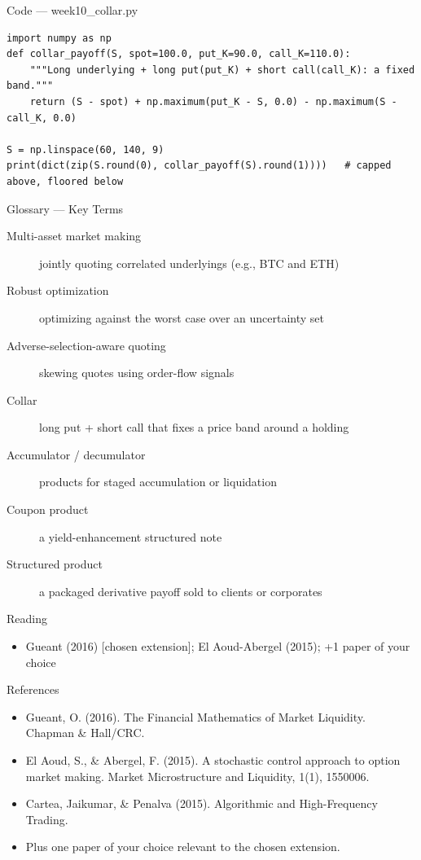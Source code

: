 \documentclass[aspectratio=169,10pt]{beamer}
\begin{document}
\begin{frame}[fragile]{Code --- week10\_collar.py}
\begin{lstlisting}
import numpy as np
def collar_payoff(S, spot=100.0, put_K=90.0, call_K=110.0):
    """Long underlying + long put(put_K) + short call(call_K): a fixed band."""
    return (S - spot) + np.maximum(put_K - S, 0.0) - np.maximum(S - call_K, 0.0)

S = np.linspace(60, 140, 9)
print(dict(zip(S.round(0), collar_payoff(S).round(1))))   # capped above, floored below
\end{lstlisting}
\end{frame}
\begin{frame}{Glossary --- Key Terms}
\footnotesize\begin{description}
\item[\color{ncsured}Multi-asset market making] jointly quoting correlated underlyings (e.g., BTC and ETH)
\item[\color{ncsured}Robust optimization] optimizing against the worst case over an uncertainty set
\item[\color{ncsured}Adverse-selection-aware quoting] skewing quotes using order-flow signals
\item[\color{ncsured}Collar] long put + short call that fixes a price band around a holding
\item[\color{ncsured}Accumulator / decumulator] products for staged accumulation or liquidation
\item[\color{ncsured}Coupon product] a yield-enhancement structured note
\item[\color{ncsured}Structured product] a packaged derivative payoff sold to clients or corporates
\end{description}
\end{frame}

\begin{frame}{Reading}
\begin{itemize}
  \item Gueant (2016) [chosen extension]; El Aoud-Abergel (2015); +1 paper of your choice
\end{itemize}
\end{frame}

\begin{frame}{References}
\scriptsize\begin{itemize}\setlength{\itemsep}{3pt}
  \item Gueant, O. (2016). The Financial Mathematics of Market Liquidity. Chapman \& Hall/CRC.
  \item El Aoud, S., \& Abergel, F. (2015). A stochastic control approach to option market making. Market Microstructure and Liquidity, 1(1), 1550006.
  \item Cartea, Jaikumar, \& Penalva (2015). Algorithmic and High-Frequency Trading.
  \item Plus one paper of your choice relevant to the chosen extension.
\end{itemize}
\end{frame}
\end{document}
